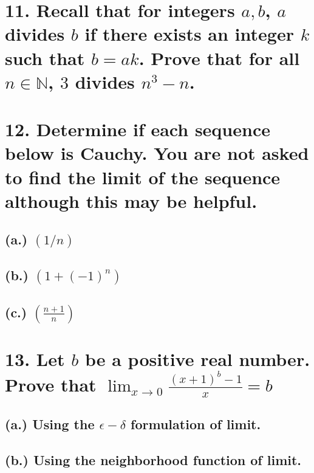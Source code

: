\documentclass{article}
\begin{document}
\section*{11. Recall that for integers $a,b$, $a$ divides $b$ if there exists an integer $k$ such that $b = ak$. Prove that for all $n \in \mathbb{N}$, $3$ divides $n^3 -n$.}

\section*{12. Determine if each sequence below is Cauchy. You are not asked to find the limit of the sequence although this may be helpful.}
\subsection*{(a.) $(1/n)$}
\subsection*{(b.) $(1+(-1)^n)$}
\subsection*{(c.) $(\frac{n+1}{n})$}

\section*{13. Let $b$ be a positive real number. Prove that $\lim_{x \to 0} \frac{(x+1)^b - 1}{x} = b$}
\subsection*{(a.) Using the $\epsilon - \delta$ formulation of limit.}
\subsection*{(b.) Using the neighborhood function of limit.}
\end{document}
